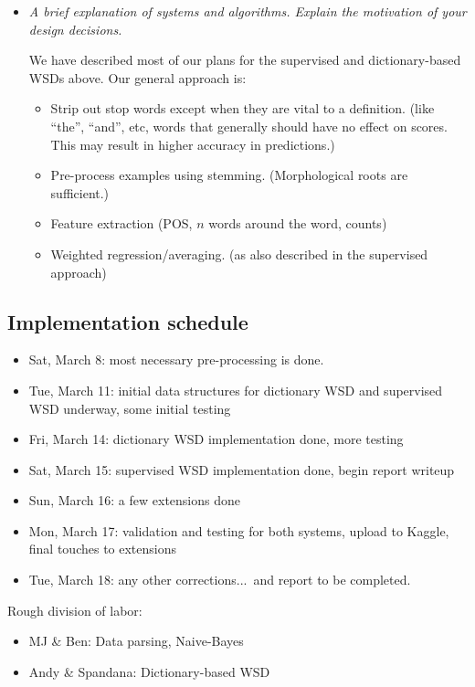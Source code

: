 \documentclass{article}
\begin{document}
\begin{itemize}
\item \textit{A brief explanation of systems and algorithms. Explain the motivation of your design decisions.}\par
We have described most of our plans for the supervised and dictionary-based WSDs above. Our general approach is:
\begin{itemize}[noitemsep,nolistsep]
\item Strip out stop words except when they are vital to a definition. (like ``the'', ``and'', etc, words that generally should have no effect on scores. This may result in higher accuracy in predictions.)
\item Pre-process examples using stemming. (Morphological roots are sufficient.)
\item Feature extraction (POS, $n$ words around the word, counts)
\item Weighted regression/averaging. (as also described in the supervised approach)
\end{itemize}

\end{itemize}

\subsection*{Implementation schedule}

\begin{itemize}[noitemsep]
\item Sat, March 8: most necessary pre-processing is done.
\item Tue, March 11: initial data structures for dictionary WSD and supervised WSD underway, some initial testing
\item Fri, March 14: dictionary WSD implementation done, more testing
\item Sat, March 15: supervised WSD implementation done, begin report writeup
\item Sun, March 16: a few extensions done
\item Mon, March 17: validation and testing for both systems, upload to Kaggle, final touches to extensions
\item Tue, March 18: any other corrections...\ and report to be completed.
\end{itemize}

Rough division of labor:
\begin{itemize}[noitemsep]
\item MJ \& Ben: Data parsing, Naive-Bayes
\item Andy \& Spandana: Dictionary-based WSD
\end{itemize}
\end{document}

